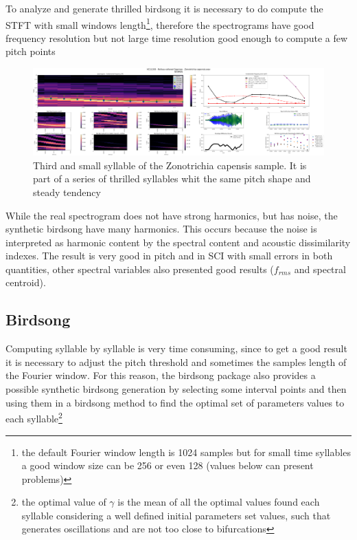 To analyze and generate thrilled birdsong it is necessary to do compute the STFT with small windows length\footnote{the default Fourier window length is 1024 samples but for small time syllables a good window size can be 256 or even 128 (values below can present problems)}, therefore the spectrograms have good frequency resolution but not large time resolution good enough to compute a few pitch points

\begin{figure}[H]
    \centering
    \includegraphics[width=\linewidth]{Images/ScoresVariables-syllable-XC11293 - Rufous-collared Sparrow - Zonotrichia capensis.wav-0.png}
    \caption{Third and small syllable of the Zonotrichia capensis sample. It is part of a series of thrilled syllables whit the same pitch shape and steady tendency}
    \label{fig:}
\end{figure}

While the real spectrogram does not have strong harmonics, but has noise, the synthetic birdsong have many harmonics. This occurs because the noise is interpreted as harmonic content by the spectral content and acoustic dissimilarity indexes. The result is very good in pitch and in SCI with small errors in both quantities, other spectral variables also presented good results ($f_{rms} $ and spectral centroid).

\subsection{Birdsong}

Computing syllable by syllable is very time consuming, since to get a good result it is necessary to adjust the pitch threshold and sometimes the samples length of the Fourier window. For this reason, the birdsong package also provides a possible synthetic birdsong generation by selecting some interval points and then using them in a  birdsong method to find the optimal set of  parameters values to each syllable\footnote{the optimal value of $\gamma$ is the mean of all the optimal values found each syllable considering a well defined initial parameters set values, such that generates oscillations and are not too close to bifurcations}



